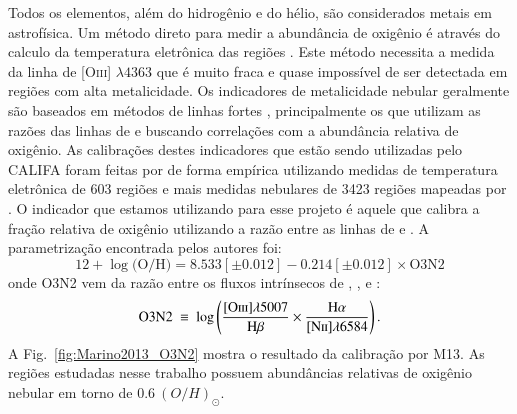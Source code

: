 Todos os elementos, além do hidrogênio e do hélio, são considerados metais em astrofísica.
Um método direto para medir a abundância de oxigênio é através do calculo da temperatura eletrônica
das regiões \Hii. Este método necessita a medida da linha de [O\thinspace\textsc{iii}] $\lambda
4363$\xspace que é muito fraca e quase impossível de ser detectada em regiões com alta metalicidade.
Os indicadores de metalicidade nebular geralmente são baseados em métodos de linhas fortes
\citep[\emph{strong-line methods}; ][]{Pagel.etal.1979a}, principalmente os que utilizam as razões
das linhas de \OIII e \NII buscando correlações com a abundância relativa de oxigênio. As calibrações
destes indicadores que estão sendo utilizadas pelo CALIFA foram feitas por \citet[][M13 daqui em
diante]{Marino.etal.2013a} de forma empírica utilizando medidas de temperatura eletrônica de 603
regiões \Hii e mais medidas nebulares de 3423 regiões \Hii mapeadas por \citet{Sanchez.etal.2013a}.
O indicador que estamos utilizando para esse projeto é aquele que calibra a fração relativa de
oxigênio utilizando a razão entre as linhas de \oIII e \nII. A parametrização encontrada pelos
autores foi:
\begin{equation}
	12 + \log \textrm{(O/H)} = 8.533[\pm0.012] - 0.214[\pm0.012]\times \textrm{O3N2}
\end{equation}
\noindent onde O3N2 vem da razão entre os fluxos intrínsecos de \oIII, \Hbeta, \nII e \Halpha:
\begin{equation}
	\textrm{O3N2}\ \equiv\ \log \left(\frac{\OIII}{\Hbeta} \times \frac{\Halpha}{\NII}\right). 
\end{equation}
A Fig.\ \ref{fig:Marino2013_O3N2} mostra o resultado da calibração por M13. As regiões estudadas
nesse trabalho possuem abundâncias relativas de oxigênio nebular em torno de $0.6\ (O/H)_\odot$.

